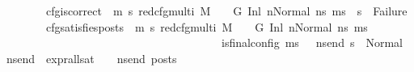 \begin{isabellebody}
\ \ \ \ \ \ \ cfg{\isacharunderscore}{\kern0pt}is{\isacharunderscore}{\kern0pt}correct{\isacharcolon}{\kern0pt}\ {\isachardoublequoteopen}{\isasymAnd}\ m{\isacharprime}{\kern0pt}\ s{\isacharprime}{\kern0pt}{\isachardot}{\kern0pt}\ {\isacharparenleft}{\kern0pt}red{\isacharunderscore}{\kern0pt}cfg{\isacharunderscore}{\kern0pt}multi\ M\ {\isasymLambda}\ {\isasymGamma}\ {\isasymOmega}\ G\ {\isacharparenleft}{\kern0pt}{\isacharparenleft}{\kern0pt}Inl\ n{\isacharparenright}{\kern0pt}{\isacharcomma}{\kern0pt}{\isacharparenleft}{\kern0pt}Normal\ ns{}{\isacharparenright}{\kern0pt}{\isacharparenright}{\kern0pt}\ {\isacharparenleft}{\kern0pt}m{\isacharprime}{\kern0pt}{\isacharcomma}{\kern0pt}s{\isacharprime}{\kern0pt}{\isacharparenright}{\kern0pt}{\isacharparenright}{\kern0pt}\ {\isasymLongrightarrow}\ {\isacharparenleft}{\kern0pt}s{\isacharprime}{\kern0pt}\ {\isasymnoteq}\ Failure{\isacharparenright}{\kern0pt}{\isachardoublequoteclose}\isanewline
\ \ \ \ \ \ \ cfg{\isacharunderscore}{\kern0pt}satisfies{\isacharunderscore}{\kern0pt}posts{\isacharcolon}{\kern0pt}\ {\isachardoublequoteopen}{\isasymAnd}\ m{\isacharprime}{\kern0pt}\ s{\isacharprime}{\kern0pt}{\isachardot}{\kern0pt}\ {\isacharparenleft}{\kern0pt}red{\isacharunderscore}{\kern0pt}cfg{\isacharunderscore}{\kern0pt}multi\ M\ {\isasymLambda}\ {\isasymGamma}\ {\isasymOmega}\ G\ {\isacharparenleft}{\kern0pt}{\isacharparenleft}{\kern0pt}Inl\ n{\isacharparenright}{\kern0pt}{\isacharcomma}{\kern0pt}{\isacharparenleft}{\kern0pt}Normal\ ns{}{\isacharparenright}{\kern0pt}{\isacharparenright}{\kern0pt}\ {\isacharparenleft}{\kern0pt}m{\isacharprime}{\kern0pt}{\isacharcomma}{\kern0pt}s{\isacharprime}{\kern0pt}{\isacharparenright}{\kern0pt}{\isacharparenright}{\kern0pt}\ {\isasymLongrightarrow}\ \isanewline
\ \ \ \ \ \ \ \ \ \ \ \ \ \ \ \ \ \ \ \ \ \ \ \ \ \ \ \ \ \ \ \ \ \ \ \ \ \ is{\isacharunderscore}{\kern0pt}final{\isacharunderscore}{\kern0pt}config\ {\isacharparenleft}{\kern0pt}m{\isacharprime}{\kern0pt}{\isacharcomma}{\kern0pt}s{\isacharprime}{\kern0pt}{\isacharparenright}{\kern0pt}\ {\isasymLongrightarrow}\ {\isacharparenleft}{\kern0pt}{\isasymforall}\ ns{\isacharunderscore}{\kern0pt}end{\isachardot}{\kern0pt}\ s{\isacharprime}{\kern0pt}\ {\isacharequal}{\kern0pt}\ Normal\ ns{\isacharunderscore}{\kern0pt}end\ {\isasymlongrightarrow}\ {\isacharparenleft}{\kern0pt}expr{\isacharunderscore}{\kern0pt}all{\isacharunderscore}{\kern0pt}sat\ {\isasymLambda}\ {\isasymGamma}\ {\isasymOmega}\ ns{\isacharunderscore}{\kern0pt}end{\isacharparenright}{\kern0pt}\ posts{\isacharparenright}{\kern0pt}{\isachardoublequoteclose}\isanewline

\end{isabellebody}
